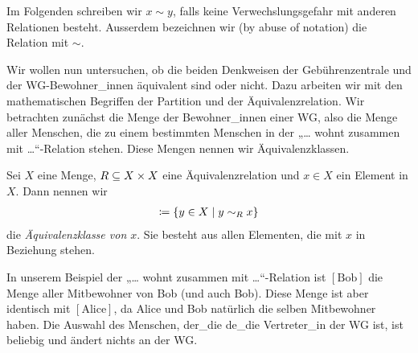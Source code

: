 
Im Folgenden schreiben wir $x\sim y$, falls keine Verwechslungsgefahr mit
anderen Relationen besteht. Ausserdem bezeichnen wir (by abuse of notation)
die Relation mit $\sim$.

Wir wollen nun untersuchen, ob die beiden Denkweisen der Gebührenzentrale
und der WG-Bewohner\_innen äquivalent sind oder nicht. Dazu arbeiten wir
mit den mathematischen Begriffen der Partition und der
Äquivalenzrelation. Wir betrachten zunächst die Menge der Bewohner\_innen
einer WG, also die Menge aller Menschen, die zu einem bestimmten Menschen
in der „… wohnt zusammen mit …“-Relation stehen. Diese Mengen nennen wir
Äquivalenzklassen.


\begin{defin}

  Sei $X$ eine Menge, $R\subseteq X\times X$ eine Äquivalenzrelation und $x\in
  X$ ein Element in $X$. Dann nennen wir
  \begin{align*}
    [ x ] \ceq \{ y\in X \mid y\sim_{R} x \}
  \end{align*}
  die \emph{Äquivalenzklasse von $x$}. Sie besteht aus allen Elementen, die
  mit $x$ in Beziehung stehen.

\end{defin}


In unserem Beispiel der „… wohnt zusammen mit …“-Relation ist $[
\text{Bob} ]$ die Menge aller Mitbewohner von Bob (und auch Bob). Diese
Menge ist aber identisch mit $[ \text{Alice} ]$, da Alice und Bob
natürlich die selben Mitbewohner haben. Die Auswahl des Menschen,
der\_die de\_die Vertreter\_in der WG ist, ist beliebig und ändert nichts
an der WG.


